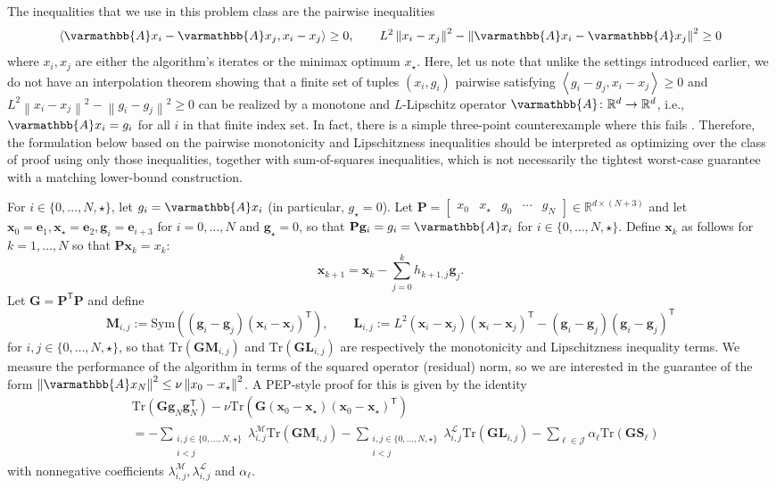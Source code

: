 \documentclass{article}
\theoremstyle{definition}
\theoremstyle{plain}
\newcommand{\ve}{{\mathbf{e}}}
\newcommand{\vg}{{\mathbf{g}}}
\newcommand{\vx}{{\mathbf{x}}}
\newcommand{\vG}{{\mathbf{G}}}
\newcommand{\vL}{{\mathbf{L}}}
\newcommand{\vM}{{\mathbf{M}}}
\newcommand{\vP}{{\mathbf{P}}}
\newcommand{\vS}{{\mathbf{S}}}
\newcommand{\cJ}{{\mathcal{J}}}
\newcommand{\cL}{{\mathcal{L}}}
\newcommand{\cM}{{\mathcal{M}}}
\newcommand{\reals}{\mathbb{R}}
\newcommand{\opA}{{\varmathbb{A}}}
\newcommand{\inprod}[2]{\left\langle #1,#2 \right\rangle}
\newcommand{\sqnorm}[1]{\left\| #1 \right\|^2}
\newcommand{\transpose}{\mathsf{T}}
\newcommand{\bmat}[1]{\begin{bmatrix} #1 \end{bmatrix}}
\begin{document}
The inequalities that we use in this problem class are the pairwise inequalities 
\[
    \inprod{\opA x_i-\opA x_j}{x_i-x_j} \ge 0,
    \qquad
    L^2\sqnorm{x_i-x_j}-\sqnorm{\opA x_i-\opA x_j} \ge 0 
\]
where $x_i, x_j$ are either the algorithm's iterates or the minimax optimum $x_\star$.
Here, let us note that unlike the settings introduced earlier, we do not have an interpolation theorem showing that a finite set of tuples $(x_i, g_i)$ pairwise satisfying $\inprod{g_i - g_j}{x_i - x_j} \ge 0$ and $L^2 \sqnorm{x_i - x_j} - \sqnorm{g_i - g_j} \ge 0$ can be realized by a monotone and $L$-Lipschitz operator $\opA\colon \reals^d \to \reals^d$, i.e., $\opA x_i = g_i$ for all $i$ in that finite index set.
In fact, there is a simple three-point counterexample where this fails \citep[Proposition~3]{RyuTaylorBergelingGiselsson2020_operator}.
Therefore, the formulation below based on the pairwise monotonicity and Lipschitzness inequalities should be interpreted as optimizing over the class of proof using only those inequalities, together with sum-of-squares inequalities, which is not necessarily the tightest worst-case guarantee with a matching lower-bound construction.

For $i\in \{0,\dots,N,\star\}$, let $g_i = \opA x_i$ (in particular, $g_\star = 0$).
Let $\vP = \bmat{x_0 & x_\star & g_0 & \cdots & g_N} \in \reals^{d\times (N+3)}$ and let $\vx_0 = \ve_1, \vx_\star = \ve_2, \vg_i = \ve_{i+3}$ for $i=0,\dots,N$ and $\vg_\star = 0$, so that
$\vP\vg_i = g_i = \opA x_i$ for $i\in \{0,\dots,N,\star\}$.
Define $\vx_k$ as follows for $k=1,\dots,N$ so that $\vP\vx_k = x_k$:
\[
    \vx_{k+1} = \vx_k - \sum_{j=0}^k h_{k+1,j} \vg_j .
\]
Let $\vG=\vP^\transpose\vP$ and define
\[
    \vM_{i,j} := \mathrm{Sym}\left((\vg_i-\vg_j)(\vx_i-\vx_j)^\transpose\right) ,
    \qquad
    \vL_{i,j} := L^2(\vx_i-\vx_j)(\vx_i-\vx_j)^\transpose - (\vg_i-\vg_j)(\vg_i-\vg_j)^\transpose 
\]
for $i,j \in \{0,\dots,N,\star\}$, so that $\mathrm{Tr}(\vG\vM_{i,j})$ and $\mathrm{Tr}(\vG\vL_{i,j})$ are respectively the monotonicity and Lipschitzness inequality terms.
We measure the performance of the algorithm in terms of the squared operator (residual) norm, so we are interested in the guarantee of the form $\sqnorm{\opA x_N}\le\nu\sqnorm{x_0-x_\star}$.
A PEP-style proof for this is given by the identity
\[
\begin{aligned}
    & \mathrm{Tr}(\vG\vg_N\vg_N^\transpose)
    -\nu\mathrm{Tr}\left(\vG(\vx_0-\vx_\star)(\vx_0-\vx_\star)^\transpose\right) \\
    & =
    -\sum_{\substack{i,j \in \{0,\dots,N,\star\}\\ i<j}}\lambda_{i,j}^\cM
    \mathrm{Tr}(\vG\vM_{i,j})
    -\sum_{\substack{i,j \in \{0,\dots,N,\star\}\\ i<j}}\lambda_{i,j}^\cL
    \mathrm{Tr}(\vG\vL_{i,j})
    -\sum_{\ell\in\cJ}\alpha_\ell\mathrm{Tr}(\vG\vS_\ell)
\end{aligned}
\]
with nonnegative coefficients $\lambda_{i,j}^\cM, \lambda_{i,j}^\cL$ and $\alpha_\ell$.
\end{document}
